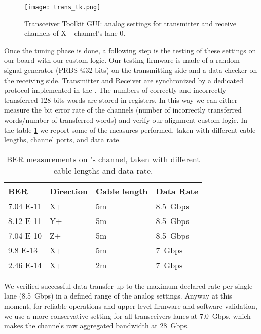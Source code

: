 \begin{figure}[!hbt]
  \centering
  \texttt{[image: trans\_tk.png]}
  \caption{Transceiver Toolkit GUI: analog settings for transmitter
  and receive channels of X+ channel's lane 0.}
  \label{fig:trans_tk}
\end{figure}

Once the tuning phase is done, a following step is the testing of
these settings on our board with our custom logic. Our testing
firmware is made of a random signal generator (PRBS @32 bits) on the
transmitting side and a data checker on the receiving side.
Transmitter and Receiver are synchronized by a dedicated protocol
implemented in the .
The numbers of correctly and incorrectly transferred 128-bits words
are stored in registers. In this way we can either measure the bit
error rate of the channels (number of incorrectly transferred
words/number of transferred words) and verify our alignment custom logic.
In the table \ref{tab:BER_table} we report some of the measures performed,
taken with different cable lengths, channel ports, and data rate.

\begin{table}[!t]
\renewcommand{\arraystretch}{1.3}
\centering
\begin{tabular}{|l||l|l|l|}
\hline
\hline
BER           & Direction & Cable length & Data Rate \\
\hline
7.04 E-11 & X+        & 5m           & 8.5~Gbps  \\
\hline
8.12 E-11 & Y+        & 5m           & 8.5~Gbps  \\
\hline
7.04 E-10 & Z+        & 5m           & 8.5~Gbps  \\
\hline
9.8 E-13  & X+        & 5m           & 7~Gbps    \\
\hline
2.46 E-14 & X+        & 2m           & 7~Gbps    \\
\hline
\hline
\end{tabular}
\caption{BER measurements on \apenetp's channel, taken with different 
cable lengths and data rate.}
\label{tab:BER_table}
\end{table}


We verified successful data transfer up to the maximum declared rate
per single lane (8.5~Gbps) in a defined range of the analog
settings. Anyway at this moment, for reliable operations and upper
level firmware and software validation, we use a more conservative
setting for all transceivers lanes at 7.0~Gbps, which makes the
channels raw aggregated bandwidth at 28~Gbps.

